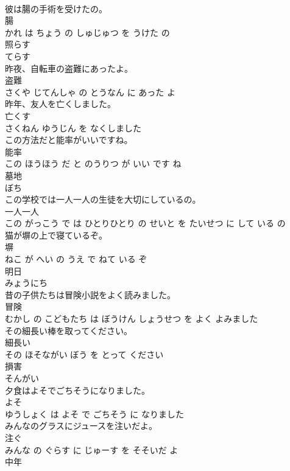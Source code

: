 \documentclass[8pt]{extreport}
\begin{document}
\begin{CJK}{UTF8}{min}
\\	彼は腸の手術を受けたの。	
\\	腸 
\\	かれ は ちょう の しゅじゅつ を うけた の			
\\	照らす	
\\	てらす		
\\	昨夜、自転車の盗難にあったよ。	
\\	盗難 
\\	さくや じてんしゃ の とうなん に あった よ			
\\	昨年、友人を亡くしました。	
\\	亡くす 
\\	さくねん ゆうじん を なくしました			
\\	この方法だと能率がいいですね。	
\\	能率 
\\	この ほうほう だ と のうりつ が いい です ね			
\\	墓地	
\\	ぼち		
\\	この学校では一人一人の生徒を大切にしているの。	
\\	一人一人 
\\	この がっこう で は ひとりひとり の せいと を たいせつ に して いる の			
\\	猫が塀の上で寝ているぞ。	
\\	塀 
\\	ねこ が へい の うえ で ねて いる ぞ			
\\	明日	
\\	みょうにち		
\\	昔の子供たちは冒険小説をよく読みました。	
\\	冒険 
\\	むかし の こどもたち は ぼうけん しょうせつ を よく よみました			
\\	その細長い棒を取ってください。	
\\	細長い 
\\	その ほそながい ぼう を とって ください			
\\	損害	
\\	そんがい		
\\	夕食はよそでごちそうになりました。	
\\	よそ 
\\	ゆうしょく は よそ で ごちそう に なりました			
\\	みんなのグラスにジュースを注いだよ。	
\\	注ぐ 
\\	みんな の ぐらす に じゅーす を そそいだ よ			
\\	中年	

\end{CJK}
\end{document}

